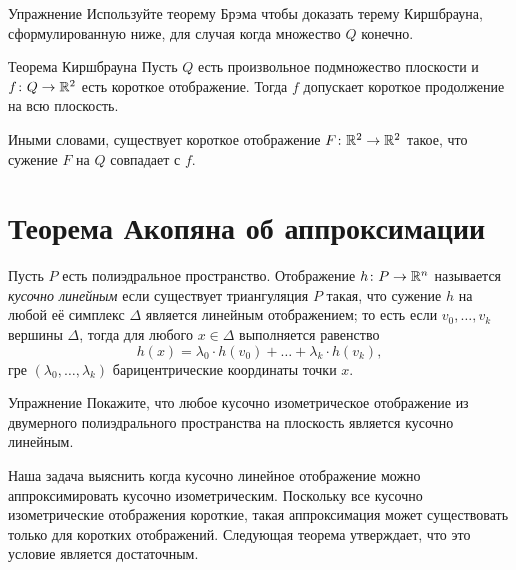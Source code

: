 \begin{thm}{Упражнение}\label{pr:brehm}
Используйте теорему Брэма чтобы доказать терему Киршбрауна, 
сформулированную ниже, для случая когда множество $Q$ конечно.
\end{thm}



\begin{thm}{Теорема Киршбрауна}
Пусть $Q$ есть произвольное подмножество плоскости и $f\colon Q\to\mathbb{R}^2$ есть короткое отображение.
Тогда $f$ допускает  короткое продолжение на всю плоскость.

Иными словами, существует короткое отображение $F\colon\mathbb{R}^2\to\mathbb{R}^2$ 
такое, что сужение $F$ на $Q$ совпадает с $f$.
\end{thm}



\section{Теорема Акопяна об аппроксимации}

Пусть $P$ есть полиэдральное пространство.
Отображение $h\colon P\to\mathbb{R}^n$ называется 
\emph{кусочно линейным}\label{page:piecewise linear map}
если существует триангуляция $P$ такая, что 
сужение $h$ на любой её симплекс $\Delta$ является линейным отображением;
то есть если $v_0,\dots,v_k$ вершины $\Delta$,
тогда для любого $x\in \Delta$ выполняется равенство
\[h(x)
=
\lambda_0\cdot h(v_0)+\dots+\lambda_k\cdot h(v_k),\]
гре $(\lambda_0,\dots,\lambda_k)$ барицентрические координаты точки  $x$.

\begin{thm}{Упражнение}\label{ex:PDPisPL}
Покажите, что любое кусочно изометрическое отображение из двумерного полиэдрального пространства на плоскость является кусочно линейным.
\end{thm}

Наша задача выяснить когда кусочно линейное отображение можно аппроксимировать кусочно изометрическим. 
Поскольку все кусочно изометрические отображения короткие, 
такая аппроксимация может существовать только для коротких отображений.
Следующая теорема утверждает, 
что это условие является достаточным.

